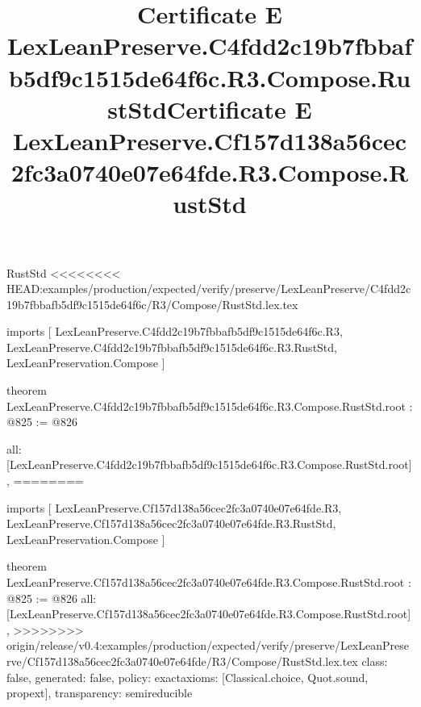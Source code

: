 \begin{lexlean}{RustStd}
<<<<<<<< HEAD:examples/production/expected/verify/preserve/LexLeanPreserve/C4fdd2c19b7fbbafb5df9c1515de64f6c/R3/Compose/RustStd.lex.tex
\title{Certificate E LexLeanPreserve.C4fdd2c19b7fbbafb5df9c1515de64f6c.R3.Compose.RustStd}
\begin{coremodule}
imports [
  LexLeanPreserve.C4fdd2c19b7fbbafb5df9c1515de64f6c.R3,
  LexLeanPreserve.C4fdd2c19b7fbbafb5df9c1515de64f6c.R3.RustStd,
  LexLeanPreservation.Compose
]

theorem LexLeanPreserve.C4fdd2c19b7fbbafb5df9c1515de64f6c.R3.Compose.RustStd.root : @825 := @826 {
  all: [LexLeanPreserve.C4fdd2c19b7fbbafb5df9c1515de64f6c.R3.Compose.RustStd.root],
========
\title{Certificate E LexLeanPreserve.Cf157d138a56cec2fc3a0740e07e64fde.R3.Compose.RustStd}
\begin{coremodule}
imports [
  LexLeanPreserve.Cf157d138a56cec2fc3a0740e07e64fde.R3,
  LexLeanPreserve.Cf157d138a56cec2fc3a0740e07e64fde.R3.RustStd,
  LexLeanPreservation.Compose
]

theorem LexLeanPreserve.Cf157d138a56cec2fc3a0740e07e64fde.R3.Compose.RustStd.root : @825 := @826 {
  all: [LexLeanPreserve.Cf157d138a56cec2fc3a0740e07e64fde.R3.Compose.RustStd.root],
>>>>>>>> origin/release/v0.4:examples/production/expected/verify/preserve/LexLeanPreserve/Cf157d138a56cec2fc3a0740e07e64fde/R3/Compose/RustStd.lex.tex
  class: false,
  generated: false,
  policy: exact{axioms: [Classical.choice, Quot.sound, propext]},
  transparency: semireducible
}


\end{coremodule}}
\end{coremodule}
\end{lexlean}
